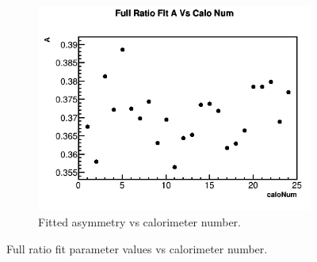 \begin{figure}[h]
	    \vspace{4mm}
	    \begin{subfigure}[t]{0.4\textwidth}
		    \centering
			\includegraphics[width=\textwidth]{RatioCBOFit_A_Vs_Calo_Canv}
		    \caption{Fitted asymmetry vs calorimeter number.}
	    \end{subfigure}
	\caption[PerCaloPlots]{Full ratio fit parameter values vs calorimeter number.}
	\label{fig:PerCaloPlots}
	\end{figure}

